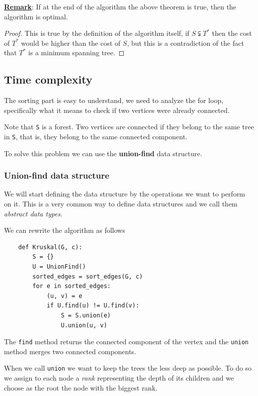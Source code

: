 \documentclass[12pt]{extarticle}
\begin{document}
\textbf{\underline{Remark}}: If at the end of the algorithm the above theorem is true, then the algorithm is optimal.

\begin{proof}
    This is true by the definition of the algorithm itself, if $S \subsetneqq T^*$ then the cost of $T^*$ would be higher than the cost of $S$, but this is a contradiction of the fact that $T^*$ is a minimum spanning tree.
\end{proof}

\subsection{Time complexity}

The sorting part is easy to understand, we need to analyze the for loop, specifically what it means to check if two vertices were already connected.

Note that \texttt{S} is a forest. Two vertices are connected if they belong to the same tree in \texttt{S}, that is, they belong to the same connected component.

To solve this problem we can use the \textbf{union-find} data structure.

\subsubsection {Union-find data structure}

We will start defining the data structure by the operations we want to perform on it. This is a very common way to define data structures and we call them \textit{abstract data types}.

We can rewrite the algorithm as follows

\begin{verbatim}
    def Kruskal(G, c):
        S = {}
        U = UnionFind()
        sorted_edges = sort_edges(G, c)
        for e in sorted_edges:
            (u, v) = e
            if U.find(u) != U.find(v):
                S = S.union(e)
                U.union(u, v)
\end{verbatim}

The \texttt{find} method returns the connected component of the vertex and the \texttt{union} method merges two connected components.

When we call \texttt{union} we want to keep the trees the less deep as possible. To do so we assign to each node a \textit{rank} representing the depth of its children and we choose as the root the node with the biggest rank.
\end{document}
